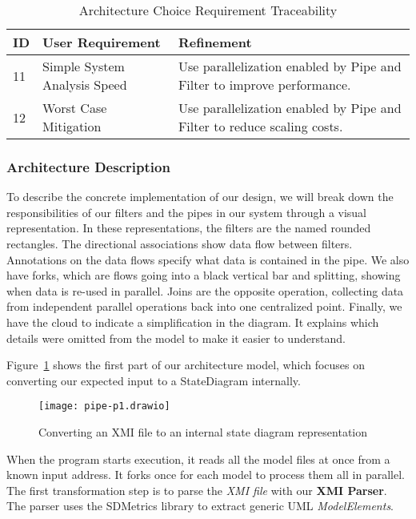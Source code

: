 \begin{table}[htbp]
    \centering
    \caption{Architecture Choice Requirement Traceability}\label{tab:arch-choice-table}
    \begin{tabularx}{\textwidth}{| l | l | X |}
        \hline
        \textbf{ID} & \textbf{User Requirement} & \textbf{Refinement} \\
        \hline
        11 & Simple System Analysis Speed & Use parallelization enabled by Pipe and Filter to improve performance. \\ \hline
        12 & Worst Case Mitigation & Use parallelization enabled by Pipe and Filter to reduce scaling costs.  \\ \hline
    \end{tabularx}
\end{table}

\newpage
\subsubsection{Architecture Description}\label{subsubsec:arch-desc}
To describe the concrete implementation of our design,
we will break down the responsibilities of our filters and the pipes in our system through a visual representation.
In these representations, the filters are the named rounded rectangles.
The directional associations show data flow between filters.
Annotations on the data flows specify what data is contained in the pipe.
We also have forks, which are flows going into a black vertical bar and splitting, showing when data is re-used in parallel.
Joins are the opposite operation, collecting data from independent parallel operations back into one centralized point.
Finally, we have the cloud to indicate a simplification in the diagram.
It explains which details were omitted from the model to make it easier to understand.

Figure~\ref{fig:pipe-1} shows the first part of our architecture model, which focuses on converting our expected input to a StateDiagram internally.
\begin{figure}[ht]
    \centering
    \texttt{[image: pipe-p1.drawio]}
    \caption{Converting an XMI file to an internal state diagram representation}
    \label{fig:pipe-1}
\end{figure}

When the program starts execution, it reads all the model files at once from a known input address.
It forks once for each model to process them all in parallel.
The first transformation step is to parse the \textit{XMI file} with our \textbf{XMI Parser}.
The parser uses the SDMetrics library to extract generic UML \textit{ModelElements}.

